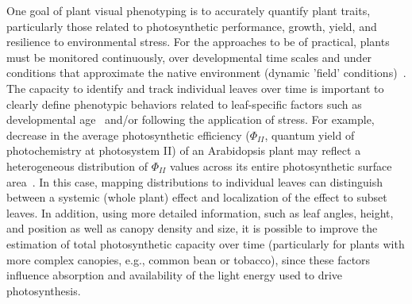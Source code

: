 One goal of plant visual phenotyping is to accurately quantify plant traits, particularly those related to photosynthetic performance, growth, yield, and resilience to environmental stress.
For the approaches to be of practical, plants must be monitored continuously, over developmental time scales and under conditions that approximate the native environment (dynamic 'field' conditions)~\cite{fahlgren2015lights,walter2015plant}.
%
The capacity to identify and track individual leaves over time is important to clearly define phenotypic behaviors related to leaf-specific factors such as developmental age~\cite{schottler2015photosynthetic} and/or following the application of stress.
For example, decrease in the average photosynthetic efficiency ($\Phi_{II}$, quantum yield of photochemistry at photosystem II) of an Arabidopsis plant may reflect a heterogeneous distribution of $\Phi_{II}$ values across its entire photosynthetic surface area~\cite{oxborough2004imaging}.
In this case, mapping distributions to individual leaves can distinguish between a systemic (whole plant) effect and localization of the effect to subset leaves.
%
In addition, using more detailed information, such as leaf angles, height, and position as well as canopy density and size, it is possible to improve the estimation of total photosynthetic capacity over time (particularly for plants with more complex canopies, e.g., common bean or tobacco), since these factors influence absorption and availability of the light energy used to drive photosynthesis.

